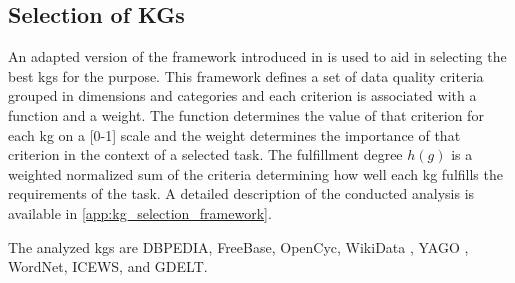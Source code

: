 \subsection{Selection of KGs}
\label{subsec:selection_of_kgs}
An adapted version of the framework introduced in \cite{farber2017dataquality} is used to aid in selecting the best \glspl{kg} for the purpose.
This framework defines a set of data quality criteria grouped in dimensions and categories and each criterion is associated with a function and a weight.
The function determines the value of that criterion for each \gls{kg} on a [0-1] scale and the weight determines the importance of that criterion in the context of a selected task.
The fulfillment degree $h(g)$ is a weighted normalized sum of the criteria determining how well each \gls{kg} fulfills the requirements of the task.
A detailed description of the conducted analysis is available in \autoref{app:kg_selection_framework}.

The analyzed \glspl{kg} are DBPEDIA, FreeBase, OpenCyc, WikiData \cite{vrandecic2014wikidata}, YAGO \cite{mahdisoltani2015YAGO3}, WordNet, ICEWS, and GDELT.

\begin{comment}

OpenCyc is disregarded as it stores no temporal information, is significantly smaller than the other graphs and only partly available as it is a subgraph of a proprietary graph.

something about consistency and it being a problem
\end{comment}